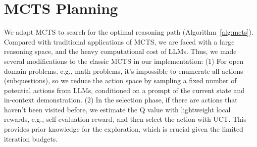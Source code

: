 \newpage



\section{MCTS Planning}
\label{sec:mcts_app}
We adapt MCTS to search for the optimal reasoning path (Algorithm~\ref{alg:mcts}). Compared with traditional applications of MCTS, we are faced with a large reasoning space, and the heavy computational cost of LLMs. Thus, we made several modifications to the classic MCTS in our implementation: (1) For open domain problems, e.g., math problems, it's impossible to enumerate all actions (subquestions), so we reduce the action space by sampling a fixed number of potential actions from LLMs, conditioned on a prompt of the current state and in-context demonstration. (2) In the selection phase, if there are actions that haven't been visited before, we estimate the Q value with lightweight local rewards, e.g., self-evaluation reward, and then select the action with UCT. This provides prior knowledge for the exploration, which is crucial given the limited iteration budgets.


